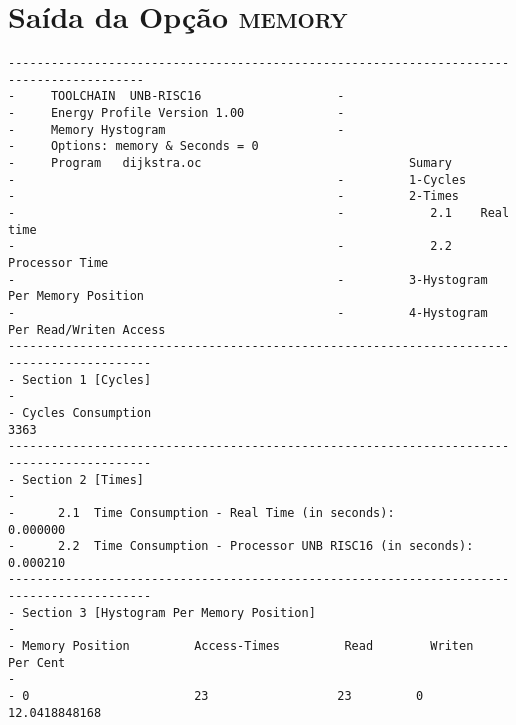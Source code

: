 \section{Saída da Opção \textsc{memory}}
\scriptsize
\begin{verbatim}
-----------------------------------------------------------------------------------------
-     TOOLCHAIN  UNB-RISC16                   -                                          
-     Energy Profile Version 1.00             -                                            
-     Memory Hystogram                        -                                            
-     Options: memory & Seconds = 0
-     Program   dijkstra.oc                             Sumary 
-                                             -         1-Cycles                     
-                                             -         2-Times                      
-                                             -            2.1    Real time           
-                                             -            2.2    Processor Time      
-                                             -         3-Hystogram Per Memory Position
-                                             -         4-Hystogram Per Read/Writen Access
------------------------------------------------------------------------------------------
- Section 1 [Cycles]                                                                      
-                                                                                         
- Cycles Consumption                                                   3363                 
------------------------------------------------------------------------------------------
- Section 2 [Times]                                                                       
-                                                                                         
-      2.1  Time Consumption - Real Time (in seconds):                0.000000                 
-      2.2  Time Consumption - Processor UNB RISC16 (in seconds):     0.000210                 
------------------------------------------------------------------------------------------
- Section 3 [Hystogram Per Memory Position]                                               
-                                                                                         
- Memory Position         Access-Times         Read        Writen         Per Cent        
-                                                                                         
- 0                       23                  23         0             12.0418848168                

\end{verbatim}
